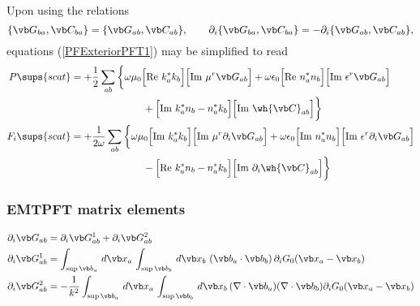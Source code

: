 Upon using the relations
$$\{\vb G_{ba}, \vb C_{ba}\} = \{\vb G_{ab}, \vb C_{ab}\}, 
  \qquad
  \partial_i\{\vb G_{ba}, \vb C_{ba}\} = -\partial_i\{\vb G_{ab}, \vb C_{ab}\}, 
$$
equations (\ref{PFExteriorPFT1}) may be simplified to read
\begin{align*}
 P\sups{scat} &= +\frac{1}{2}
  \sum_{ab}\bigg\{
           \omega \mu_0
           \Big[\text{Re }k_a^* k_b\Big]
           \Big[\text{Im }\mu^r \vb G_{ab}\Big]
          +\omega \epsilon_0
           \Big[\text{Re }n_a^* n_b\Big]
           \Big[\text{Im }\epsilon^r \vb G_{ab}\Big]
\\
&\hspace{1in} 
  +\Big[\text{Im }k_a^* n_b - n_a^* k_b\Big]
           \Big[\text{Im } \wh{\vb C}_{ab}\Big]\bigg\}
\\
 F_i\sups{scat} &= +\frac{1}{2\omega}
  \sum_{ab}\bigg\{
           \omega \mu_0
           \Big[\text{Im }k_a^* k_b\Big]
           \Big[\text{Im }\mu^r \partial_i \vb G_{ab}\Big]
          +\omega \epsilon_0
           \Big[\text{Im }n_a^* n_b\Big]
           \Big[\text{Im }\epsilon^r \partial_i \vb G_{ab}\Big]
\\
&\hspace{1in} 
  -\Big[\text{Re }k_a^* n_b - n_a^* k_b\Big]
           \Big[\text{Im } \partial_i \wh{\vb C}_{ab}\Big]\bigg\}
\end{align*}

\subsubsection*{EMTPFT matrix elements}

\begin{align*}
   \partial_i \vb G_{ab}
&= \partial_i \vb G^1_{ab} +\partial_i \vb G^2_{ab}
\\
\partial_i \vb G^1_{ab}
&=
 \int_{\sup \vb b_a}\, d\vb x_a \, 
 \int_{\sup \vb b_b}\, d\vb x_b \, 
 \left(\vb b_a \cdot \vb b_b\right) \partial_i G_0(\vb x_a-\vb x_b)
\\
\partial_i \vb G^2_{ab}
&=
 -\frac{1}{k^2}
  \int_{\sup \vb b_a}\, d\vb x_a \,
  \int_{\sup \vb b_b}\, d\vb x_b \,
   (\nabla \cdot \vb b_a)(\nabla \cdot \vb b_b)
   \partial_i G_0(\vb x_a-\vb x_b)
\end{align*}

